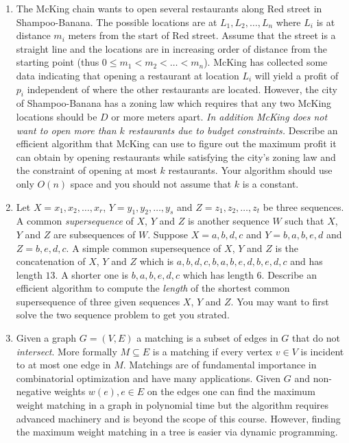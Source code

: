 \documentclass[11pt]{article}
\begin{document}
\begin{enumerate}


\item The McKing chain wants to open several restaurants along Red
  street in Shampoo-Banana. The possible locations are at $L_1,L_2,
  \ldots, L_n$ where $L_i$ is at distance $m_i$ meters from the start
  of Red street. Assume that the street is a straight line and the
  locations are in increasing order of distance from the starting
  point (thus $0 \leq m_1 < m_2 < \ldots < m_n$). McKing has collected
  some data indicating that opening a restaurant at location $L_i$
  will yield a profit of $p_i$ independent of where the other
  restaurants are located. However, the city of Shampoo-Banana has a
  zoning law which requires that any two McKing locations should be
  $D$ or more meters apart. {\em In addition McKing does not want to
    open more than $k$ restaurants due to budget constraints.}
  Describe an efficient algorithm that McKing can use to figure out the maximum
  profit it can obtain by opening restaurants while satisfying the
  city's zoning law and the constraint of opening at most $k$
  restaurants.  Your algorithm should use only $O(n)$ space and you
  should not assume that $k$ is a constant.


\item Let $X = x_1,x_2,\ldots,x_r$, $Y = y_1,y_2,\ldots,y_s$ and $Z =
  z_1,z_2,\ldots,z_t$ be three sequences. A common {\em supersequence}
  of $X$, $Y$ and $Z$ is another sequence $W$ such that $X$, $Y$ and $Z$
  are subsequences of $W$. Suppose $X = a,b,d,c$ and $Y = b,a,b,e,d$ and $Z =
  b, e, d, c$. A simple common supersequence of $X$, $Y$ and $Z$ is
  the concatenation of $X$, $Y$ and $Z$ which is
  $a,b,d,c,b,a,b,e,d,b,e,d,c$ and has length $13$. A shorter one is
  $b, a, b, e, d, c$ which has length $6$.  Describe an efficient
  algorithm to compute the {\em length} of the shortest common
  supersequence of three given sequences $X$, $Y$ and $Z$. You may want to
  first solve the two sequence problem to get you strated.

\item Given a graph $G=(V,E)$ a matching is a subset of edges in $G$
  that do not \emph{intersect}. More formally $M \subseteq E$ is a
  matching if every vertex $v \in V$ is incident to at most one edge
  in $M$. Matchings are of fundamental importance in combinatorial
  optimization and have many applications. Given $G$ and non-negative
  weights $w(e), e \in E$ on the edges one can find the maximum weight
  matching in a graph in polynomial time but the algorithm requires
  advanced machinery and is beyond the scope of this course. However,
  finding the maximum weight matching in a tree is easier via dynamic
  programming. 


\end{enumerate}
\end{document}
